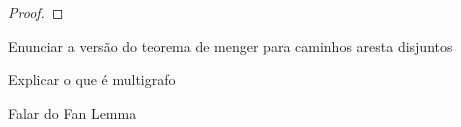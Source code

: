 \documentclass[12pt, a4paper]{article}
\theoremstyle{definition}
\begin{document}
\begin{proof}


\end{proof}


Enunciar a versão do teorema de menger para caminhos aresta disjuntos


Explicar o que é multigrafo

Falar do Fan Lemma 
\end{document}
